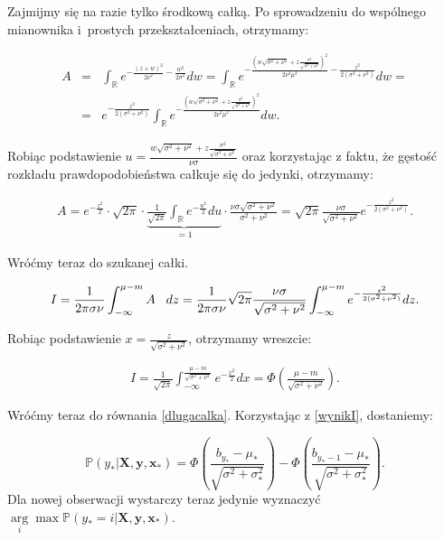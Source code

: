 \documentclass{mini}
\newcommand{\argmax}{\arg\!\max}
\begin{document}
Zajmijmy się na razie tylko środkową całką. Po sprowadzeniu do wspólnego mianownika i~prostych przekształceniach, otrzymamy:

\begin{eqnarray*}
A &=& \int_\mathbb{R} e^{-\frac{(z+w)^2}{2\nu^2} - \frac{w^2}{2\sigma^2}} dw
=
\int_\mathbb{R} e^{-\frac{\left(w\sqrt{\sigma^2+\nu^2} + z\frac{\sigma^2}{\sqrt{\sigma^2+\nu^2}}\right)^2}{2\nu^2\mu^2} - \frac{z^2}{2(\sigma^2+\nu^2)}} dw=\\
&=&
e^{- \frac{z^2}{2(\sigma^2+\nu^2)}}\int_\mathbb{R} e^{-\frac{\left(w\sqrt{\sigma^2+\nu^2} + z\frac{\sigma^2}{\sqrt{\sigma^2+\nu^2}}\right)^2}{2\nu^2\mu^2}} dw.
\end{eqnarray*}

Robiąc podstawienie $u = \frac{w\sqrt{\sigma^2+\nu^2} + z\frac{\sigma^2}{\sqrt{\sigma^2+\nu^2}}}{\nu\sigma}$ oraz korzystając z faktu, że gęstość rozkładu prawdopodobieństwa całkuje się do jedynki, otrzymamy:

\begin{eqnarray*}
A = e^{-\frac{z^2}{2}}\cdot \sqrt{2\pi}\cdot \underbrace{\frac{1}{\sqrt{2\pi}} \int_{\mathbb{R}} e^{-\frac{u^2}{2}} du}_{=1} \cdot\frac{\nu\sigma\sqrt{\sigma^2+\nu^2}}{\sigma^2+\nu^2}
=
\sqrt{2\pi}\frac{\nu\sigma}{\sqrt{\sigma^2+\nu^2}}e^{-\frac{z^2}{2(\sigma^2+\nu^2)}}.
\end{eqnarray*}

Wróćmy teraz do szukanej całki.

\begin{eqnarray*}
I = 
\frac{1}{2\pi\sigma\nu} \int_{-\infty}^{\mu-m} A\hspace{3mm} dz
=
\frac{1}{2\pi\sigma\nu} \sqrt{2\pi}\frac{\nu\sigma}{\sqrt{\sigma^2+\nu^2}}  \int_{-\infty}^{\mu-m} e^{-\frac{z^2}{2(\sigma^2+\nu^2)}} dz.
\end{eqnarray*}

Robiąc podstawienie $x = \frac{z}{\sqrt{\sigma^2+\nu^2}}$, otrzymamy wreszcie:

\begin{eqnarray}\label{wynikI}
I = 
\frac{1}{\sqrt{2\pi}}\int_{-\infty}^{\frac{\mu-m}{\sqrt{\sigma^2+\nu^2}}} e^{-\frac{x^2}{2}} dx = \Phi \left(   \frac{\mu-m}{\sqrt{\sigma^2+\nu^2}}  \right).
\end{eqnarray}

Wróćmy teraz do równania \eqref{dlugacalka}. Korzystając z \eqref{wynikI}, dostaniemy:

$$
\mathbb{P}(y_{\ast} | \textbf{X}, \textbf{y}, \mathbf{x}_{\ast}) = 
\Phi\left(\frac{b_{y_{\ast}}-\mu_{\ast}}{\sqrt{\sigma^2+\sigma^2_{\ast}}} \right) 
- 
\Phi\left( \frac{b_{y_{\ast}-1}-\mu_{\ast}}{\sqrt{\sigma^2+\sigma^2_{\ast}}} \right).
$$
Dla nowej obserwacji wystarczy teraz jedynie wyznaczyć $\underset{i}\argmax \mathbb{P}(y_{\ast}=i | \textbf{X}, \textbf{y}, \mathbf{x}_{\ast})$.
\end{document}
